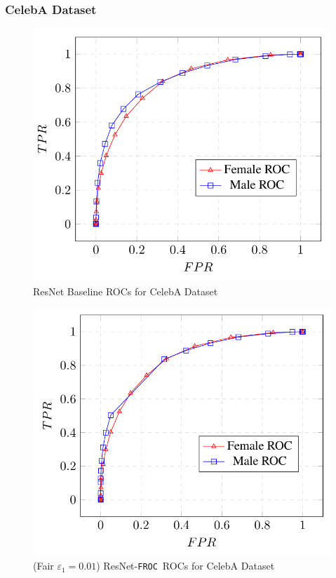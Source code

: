 \documentclass{article}
\newcommand{\ouralgo}{\texttt{FROC}}
\begin{document}
\subsubsection{CelebA Dataset}
\begin{figure}[!h]
    \centering
    \includegraphics[width=1\linewidth]{Images/CelebA_Baseline_ROC.png}
    \caption{ResNet Baseline ROCs for CelebA Dataset}
    \label{fig:CelebA_ROC}
\end{figure}

\begin{figure}[!h]
    \centering
    \includegraphics[width=1\linewidth]{Images/CelebA_Baseline_ROC_FROC.png}
    \caption{(Fair $\varepsilon_1 = 0.01$) ResNet-\ouralgo\ ROCs for CelebA Dataset}
    \label{fig:CelebA_ROC_FROC}
\end{figure}
\end{document}
